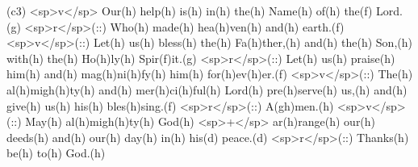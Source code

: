 (c3) <sp>v</sp> Our(h) help(h) is(h) in(h) the(h) Name(h) of(h) the(f) Lord.(g) <sp>r</sp>(::) Who(h) made(h) hea(h)ven(h) and(h) earth.(f) <sp>v</sp>(::) Let(h) us(h) bless(h) the(h) Fa(h)ther,(h) and(h) the(h) Son,(h) with(h) the(h) Ho(h)ly(h) Spir(f)it.(g) <sp>r</sp>(::) Let(h) us(h) praise(h) him(h) and(h) mag(h)ni(h)fy(h) him(h) for(h)ev(h)er.(f) <sp>v</sp>(::) The(h) al(h)migh(h)ty(h) and(h) mer(h)ci(h)ful(h) Lord(h) pre(h)serve(h) us,(h) and(h) give(h) us(h) his(h) bles(h)sing.(f) <sp>r</sp>(::) A(gh)men.(h) <sp>v</sp>(::) May(h) al(h)migh(h)ty(h) God(h) <sp>+</sp> ar(h)range(h) our(h) deeds(h) and(h) our(h) day(h) in(h) his(d) peace.(d) <sp>r</sp>(::) Thanks(h) be(h) to(h) God.(h)